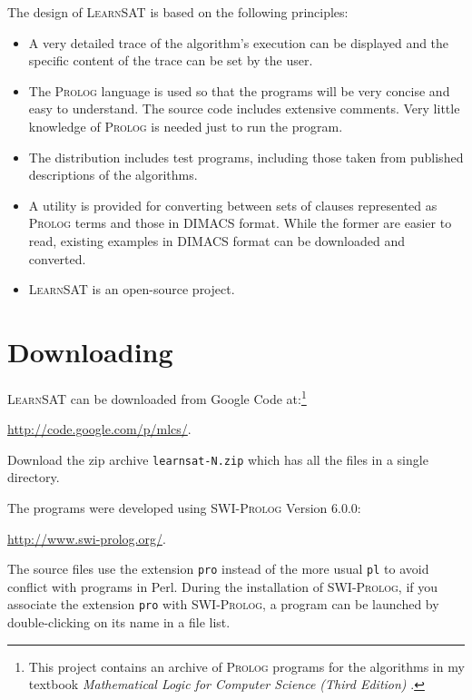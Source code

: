 \documentclass[11pt]{article}
\newcommand*{\p}[1]{\textup{\texttt{#1}}}
\newcommand*{\ls}{\textsc{LearnSAT}}
\newcommand*{\pl}{\textsc{Prolog}}
\newcommand*{\sw}{\textsc{SWI-Prolog}}
\begin{document}
The design of \ls{} is based on the following principles:

\begin{itemize}

\item A very detailed trace of the algorithm's execution can be
displayed and the specific content of the trace can be set by the user.

\item The \pl{} language is used so that the programs will be very
concise and easy to understand. The source code includes extensive
comments. Very little knowledge of \pl{} is needed just to run the
program.

\item The distribution includes test programs, including those taken
from published descriptions of the algorithms.

\item A utility is provided for converting between sets of clauses
represented as \pl{} terms and those in DIMACS format. While the former
are easier to read, existing examples in DIMACS format can be downloaded
and converted.

\item \ls{} is an open-source project.

\end{itemize}

\section{Downloading}
\ls{} can be downloaded from Google Code at:\footnote{This project
contains an archive of \pl{} programs for the algorithms in my textbook
\emph{Mathematical Logic for Computer Science (Third Edition)}
\cite{mlcs}.}
\begin{center}
\url{http://code.google.com/p/mlcs/}.
\end{center}
Download the zip archive \p{learnsat-N.zip} which has all the files in a
single directory.

The programs were developed using \sw{} Version 6.0.0:
\begin{center}
\url{http://www.swi-prolog.org/}.
\end{center}
The source files use the extension \p{pro} instead of the more usual
\p{pl} to avoid conflict with programs in Perl. During the installation
of \sw{}, if you associate the extension \p{pro} with \sw{}, a
program can be launched by double-clicking on its name in a file list. 
\end{document}
